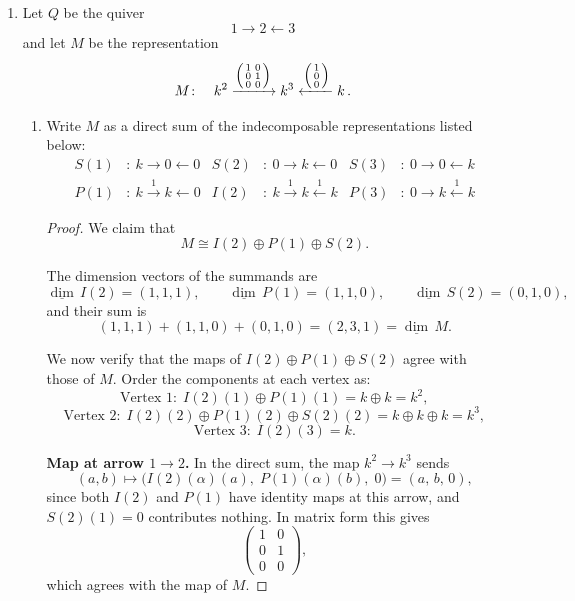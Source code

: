 \documentclass[11pt, a4paper]{article}
\begin{document}
\begin{enumerate}[leftmargin=*, label=\textbf{\arabic*.}]
\begin{enumerate}[label=(\alph*)]
\begin{proof}
    Therefore $M \not\cong M'$.
    \end{proof}
\end{enumerate}

\item Let $Q$ be the quiver
\[
1 \xrightarrow{\quad} 2 \xleftarrow{\quad} 3
\]
and let $M$ be the representation
\[
M\colon\quad k^2 \xrightarrow{\begin{psmallmatrix} 1 & 0 \\ 0 & 1 \\ 0 & 0 \end{psmallmatrix}} k^3 \xleftarrow{\begin{psmallmatrix} 1 \\ 0 \\ 0 \end{psmallmatrix}} k\,.
\]
\begin{enumerate}[label=(\alph*)]
    \item Write $M$ as a direct sum of the indecomposable representations listed below:
    \begin{align*}
        S(1) &\colon\ k \to 0 \leftarrow 0 &
        S(2) &\colon\ 0 \to k \leftarrow 0 &
        S(3) &\colon\ 0 \to 0 \leftarrow k \\[6pt]
        P(1) &\colon\ k \xrightarrow{1} k \leftarrow 0 &
        I(2) &\colon\ k \xrightarrow{1} k \xleftarrow{1} k &
        P(3) &\colon\ 0 \to k \xleftarrow{1} k
    \end{align*}
    \begin{proof}
    We claim that
    \[
    M \cong I(2) \oplus P(1) \oplus S(2).
    \]
    
    The dimension vectors of the summands are
    \[
    \underline{\dim}\,I(2) = (1,1,1),\qquad \underline{\dim}\,P(1) = (1,1,0),\qquad \underline{\dim}\,S(2) = (0,1,0),
    \]
    and their sum is
    \[
    (1,1,1)+(1,1,0)+(0,1,0) = (2,3,1) = \underline{\dim}\,M.
    \]
    
    We now verify that the maps of $I(2)\oplus P(1)\oplus S(2)$ agree with those of $M$. Order the components at each vertex as:
    \[
    \text{Vertex }1\colon\; I(2)(1)\oplus P(1)(1) = k\oplus k = k^2,
    \]
    \[
    \text{Vertex }2\colon\; I(2)(2)\oplus P(1)(2)\oplus S(2)(2) = k\oplus k\oplus k = k^3,
    \]
    \[
    \text{Vertex }3\colon\; I(2)(3) = k.
    \]
    
    \medskip\noindent\textbf{Map at arrow $1\to 2$.}
    In the direct sum, the map $k^2 \to k^3$ sends
    \[
    (a,b) \longmapsto \bigl(I(2)(\alpha)(a),\; P(1)(\alpha)(b),\; 0\bigr) = (a,\,b,\,0),
    \]
    since both $I(2)$ and $P(1)$ have identity maps at this arrow, and $S(2)(1)=0$ contributes nothing. In matrix form this gives
    \[
    \begin{pmatrix} 1 & 0 \\ 0 & 1 \\ 0 & 0 \end{pmatrix},
    \]
    which agrees with the map of $M$.
    

\end{proof}
\end{enumerate}
\end{enumerate}
\end{document}
